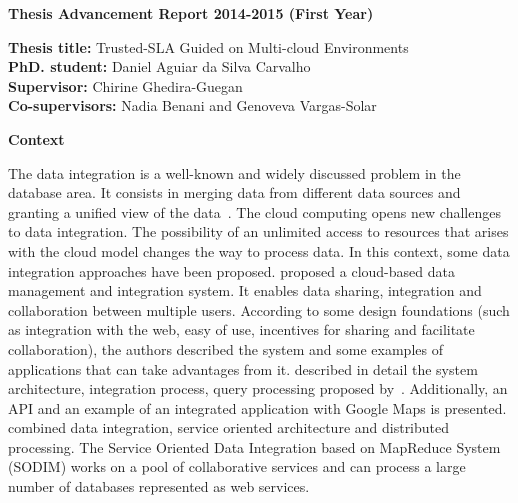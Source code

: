 \documentclass[12pt,a4paper,oneside]{report}
\author{Daniel Aguiar da Silva Carvalho}
\begin{document}
\sffamily
\begin{center}
\textbf{\large{Thesis Advancement Report 2014-2015 (First Year)}}
\end{center}

\begin{flushleft}
\textbf{Thesis title:} Trusted-SLA Guided on Multi-cloud Environments \\
\textbf{PhD. student:} Daniel Aguiar da Silva Carvalho \\
\textbf{Supervisor:} Chirine Ghedira-Guegan \\ 
\textbf{Co-supervisors:} Nadia Benani and Genoveva Vargas-Solar
\end{flushleft}

\begin{flushleft}
\textbf{Context}\\
\end{flushleft}

The data integration is a well-known and widely discussed problem in the database area. 
It consists in merging data from different data sources and granting a unified view of the data~\cite{Lenzerini:2002}. 
The cloud computing opens new challenges to data integration. 
The possibility of an unlimited access to resources that arises with the cloud model changes the way to process data.
In this context, some data integration approaches have been proposed.
\cite{Gonzalez:2010b} proposed a cloud-based data management and integration system.
It enables data sharing, integration and collaboration between multiple users. 
According to some design foundations (such as integration with the web, easy of use, incentives for sharing and facilitate collaboration), the authors described the system  and some examples of applications that can take advantages from it. 
\cite{Gonzalez:2010} described in detail the system architecture, integration process, query processing proposed by~\cite{Gonzalez:2010b}. 
Additionally, an API and an example of an integrated application with Google Maps is presented. 
\cite{078} combined data integration, service oriented architecture and distributed processing. 
The Service Oriented Data Integration based on MapReduce System (SODIM) works on a pool of collaborative services and can process a large number of databases represented as web services. 
\end{document}
